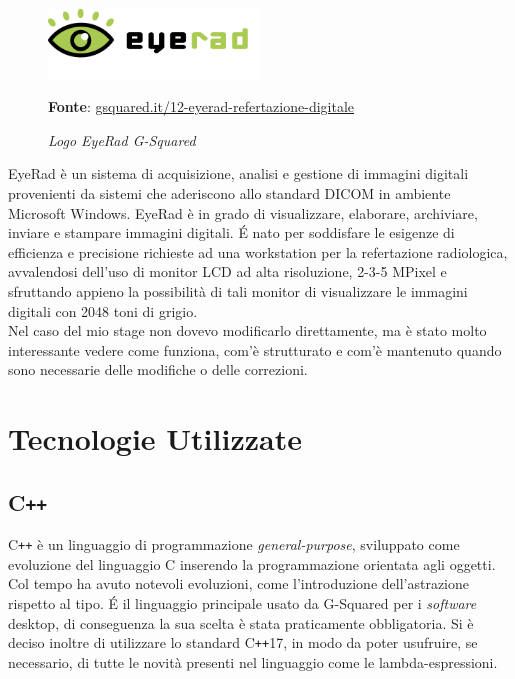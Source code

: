 \begin{figure}[h]
    \centering
    \includegraphics[width=0.5\textwidth]{immagini/logo-software-eyerad.png}
    \caption{\textit{Logo EyeRad G-Squared}}
    \textbf{Fonte}: \href{https://www.gsquared.it/it/pacs-ris-web-gateway-dicom-ihe-2/software-immagini-medicali/12-eyerad-refertazione-digitale}{gsquared.it/12-eyerad-refertazione-digitale}
    \label{fig: Logo software EyeRad G-Squared}
\end{figure}

EyeRad è un sistema di acquisizione, analisi e gestione di immagini digitali provenienti da sistemi che aderiscono allo standard DICOM in ambiente Microsoft Windows.
EyeRad è in grado di visualizzare, elaborare, archiviare, inviare e stampare immagini digitali.
\'E nato per soddisfare le esigenze di efficienza e precisione richieste ad una workstation per la refertazione radiologica, avvalendosi dell'uso di monitor LCD ad alta risoluzione, 2-3-5 MPixel e sfruttando appieno la possibilità di tali monitor di visualizzare le immagini digitali con 2048 toni di grigio.
\\
Nel caso del mio stage non dovevo modificarlo direttamente, ma è stato molto interessante vedere come funziona, com'è strutturato e com'è mantenuto quando sono necessarie delle modifiche o delle correzioni.

\section{Tecnologie Utilizzate}
\subsection{C\texttt{++}}\label{sec:C++}
C\texttt{++} è un linguaggio di programmazione \emph{general-purpose}, sviluppato come evoluzione del linguaggio C inserendo la programmazione orientata agli oggetti. Col tempo ha avuto notevoli evoluzioni, come l'introduzione dell'astrazione rispetto al tipo. \'E il linguaggio principale usato da G-Squared per i \emph{software} desktop, di conseguenza la sua scelta è stata praticamente obbligatoria. Si è deciso inoltre di utilizzare lo standard C\texttt{++}17, in modo da poter usufruire, se necessario, di tutte le novità presenti nel linguaggio come le lambda-espressioni.


